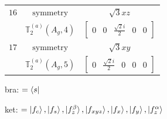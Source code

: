 \documentclass[fleqn,8pt,landscape]{jsarticle}
\begin{document}
\begin{longtable}{ccc}
$ 16 $ & $ \text{symmetry} $ & $ \sqrt{3} x z $ \\
$  $ & $ \mathbb{T}_{2}^{(a)}(A_{g},4) $ & $ \begin{bmatrix} 0 & 0 & \frac{\sqrt{2} i}{2} & 0 & 0 \end{bmatrix} $ \\ \hline
$ 17 $ & $ \text{symmetry} $ & $ \sqrt{3} x y $ \\
$  $ & $ \mathbb{T}_{2}^{(a)}(A_{g},5) $ & $ \begin{bmatrix} 0 & \frac{\sqrt{2} i}{2} & 0 & 0 & 0 \end{bmatrix} $ \\ \hline
\end{longtable}
bra: $=\bra{s}$

\noindent
ket: $=\ket{f_{c}}, \ket{f_{s}}, \ket{f_{z}^{\beta}}, \ket{f_{xyz}}, \ket{f_{x}}, \ket{f_{y}}, \ket{f_{z}^{\alpha}}$
\renewcommand{\arraystretch}{1.6}
\end{document}

